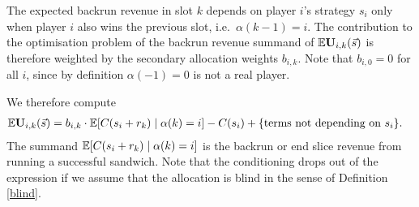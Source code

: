 The expected backrun revenue in slot $k$ depends on player $i$'s strategy $s_i$ only when player $i$ also wins the previous slot, i.e.~$\alpha(k-1)=i$.
%
The contribution to the optimisation problem of the backrun revenue summand of $\mathbb{E}\mathbf{U}_{i,k}(\vec{s})$ is therefore weighted by the secondary allocation weights $b_{i,k}$.
%
Note that $b_{i,0}=0$ for all $i$, since by definition $\alpha(-1)=0$ is not a real player.

We therefore compute
%
\begin{align}
  \mathbb{E}\mathbf{U}_{i,k}(\vec{s}) &= b_{i,k}\cdot \mathbb{E}[C(s_i+r_k)\mid \alpha(k)=i] - C(s_i) + \{\text{terms not depending on }s_i\}.
\end{align}
%
The summand $\mathbb{E}[C(s_i+r_k)\mid \alpha(k)=i]$ is the backrun or end slice revenue from running a successful sandwich.
%
Note that the conditioning drops out of the expression if we assume that the allocation is blind in the sense of Definition \ref{blind}.

\begin{comment}
The optimisation equation $\Expectation\Utility'_{i,k}(\vec{s})=0$ yields a straightforward differential relation
\[
  \frac{\partial}{\partial s_i} \Expectation BP_{i,k}(\vec{s}) = b_{i,k} \frac{\partial}{\partial s_i} \Expectation SP_{i,k}(s_i)
\]
between the expected backrun profit and the expected sandwich profit.
\end{comment}

